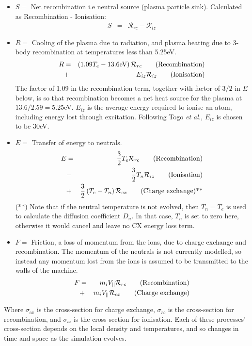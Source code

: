 \documentclass[12pt,a4paper]{article}
\begin{document}
\begin{itemize}
\item $S = $ Net recombination i.e neutral source (plasma particle sink). Calculated as Recombination - Ionisation:
\begin{eqnarray*}
  S &=& \mathcal{R}_{rc} - \mathcal{R}_{iz}
\end{eqnarray*}
\item $R = $ Cooling of the plasma due to radiation, and plasma heating due to 3-body recombination at temperatures less than 5.25eV.
  \begin{eqnarray*}
    R &=& \left(1.09 T_e - 13.6\textrm{eV}\right)\mathcal{R}_{rc} \qquad \mbox{\textrm{(Recombination)}}\\
    &+& E_{iz}\mathcal{R}_{iz}  \qquad \mbox{\textrm{(Ionisation)}}
  \end{eqnarray*}
  The factor of 1.09 in the recombination term, together with factor of $3/2$ in $E$ below, is so that recombination becomes a net heat source for the plasma at $13.6 / 2.59 = 5.25$eV. $E_{iz}$ is the average energy required to ionise an atom, including
  energy lost through excitation. Following Togo {\it et al.}, $E_{iz}$ is chosen to be 30eV.
\item $E = $ Transfer of energy to neutrals.
  \begin{eqnarray*}
    E &=& \frac{3}{2} T_e \mathcal{R}_{rc} \qquad \mbox{\textrm{(Recombination)}} \\
    &-& \frac{3}{2} T_n \mathcal{R}_{iz}  \qquad \mbox{\textrm{(Ionisation)}} \\
    &+& \frac{3}{2}\left(T_e - T_n\right)\mathcal{R}_{cx} \qquad \mbox{\textrm{(Charge exchange)**}}
  \end{eqnarray*}
  (**) Note that if the neutral temperature is not evolved, then $T_n = T_e$ is used to calculate
  the diffusion coefficient $D_n$. In that case, $T_n$ is set to zero here, otherwise it would
  cancel and leave no CX energy loss term.
\item $F = $ Friction, a loss of momentum from the ions, due to charge exchange and recombination. 
The momentum of the neutrals is not currently modelled, so instead any momentum lost from the ions 
is assumed to be transmitted to the walls of the machine. 
\begin{eqnarray*}
  F &=& m_iV_{||}\mathcal{R}_{rc} \qquad \mbox{\textrm{(Recombination)}} \\
  &+& m_iV_{||}\mathcal{R}_{cx}  \qquad \mbox{\textrm{(Charge exchange)}}
\end{eqnarray*}
\end{itemize}
Where $\sigma_{cx}$ is the cross-section for charge exchange, $\sigma_{rc}$ is the cross-section for recombination,
and $\sigma_{iz}$ is the cross-section for ionisation. Each of these processes' cross-section depends on the
local density and temperatures, and so changes in time and space as the simulation evolves.
\end{document}
